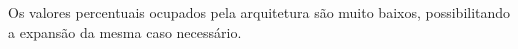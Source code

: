 \documentclass[11pt,a4paper]{article}
\begin{document}
	Os valores percentuais ocupados pela arquitetura são muito baixos, possibilitando a expansão da mesma caso necessário. 
	
	
	
	
	
	
	
\end{document}
